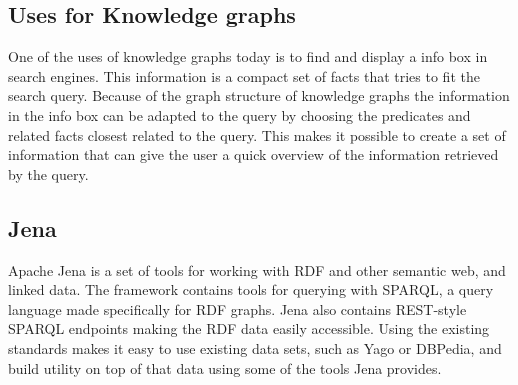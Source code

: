 
\subsection{Uses for Knowledge graphs}
One of the uses of knowledge graphs today is to find and display a info box in search engines. This information is a compact set of facts that tries to fit the search query. Because of the graph structure of knowledge graphs the information in the info box can be adapted to the query by choosing the predicates and related facts closest related to the query. This makes it possible to create a set of information that can give the user a quick overview of the information retrieved by the query.

\subsection{Jena}
Apache Jena is a set of tools for working with RDF and other semantic web, and linked data. The framework contains tools for querying with SPARQL, a query language made specifically for RDF graphs. Jena also contains REST-style SPARQL endpoints making the RDF data easily accessible. Using the existing standards makes it easy to use existing data sets, such as Yago or DBPedia, and build utility on top of that data using some of the tools Jena provides.


